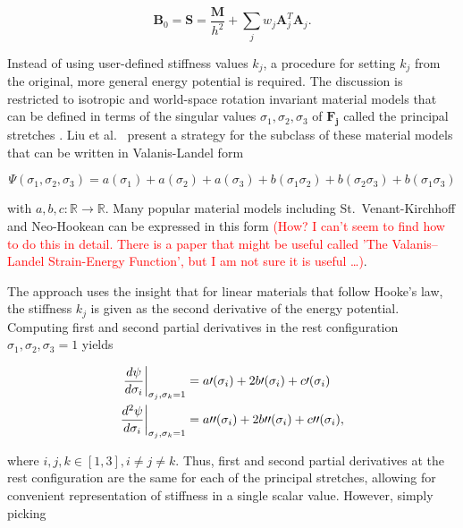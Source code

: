 \begin{equation}\label{eq:global-matrix-strain}
    \bm{B}_0 = \bm{S} = \frac{\bm{M}}{h^2} + \sum_j w_j \bm{A}_j^T \bm{A}_j.
\end{equation}

Instead of using user-defined stiffness values $k_j$, a procedure for setting $k_j$ from the original, more general energy
potential is required. The discussion is restricted to isotropic and world-space rotation invariant material models that 
can be defined in terms of the singular 
values $\sigma_1, \sigma_2, \sigma_3$ of $\bm{F_j}$ called the principal stretches \cite{sifakis2012}. Liu et al.\ 
\cite{liu2017} present a strategy for the subclass of these material models that can be written in Valanis-Landel form

\begin{equation}\label{eq:valanis-landel}
    \Psi(\sigma_1, \sigma_2, \sigma_3) = a(\sigma_1) + a(\sigma_2) + a(\sigma_3) + b(\sigma_1 \sigma_2) 
    + b(\sigma_2 \sigma_3) + b(\sigma_1 \sigma_3)
\end{equation}

\noindent with $a, b, c : \mathbb{R} \to \mathbb{R}$. Many popular material models including St.\ Venant-Kirchhoff and 
Neo-Hookean 
can be expressed in this form \textcolor{red}{(How? I can't seem to find how to do this in detail. There is a paper that 
might be useful called 'The Valanis–Landel Strain-Energy Function', but I am not sure it is useful \ldots)}.

The approach uses the insight that for linear materials that follow Hooke's law, the stiffness $k_j$ is given as the second 
derivative of the energy potential. Computing first and second partial derivatives in the rest configuration $\sigma_1, 
\sigma_2, \sigma_3 = 1$ yields

\begin{align}
    \evalat[\bigg]{\frac{d \psi}{d \sigma_i}}{\sigma_j, \sigma_k = 1} 
    &= a\prime(\sigma_i) + 2b\prime(\sigma_i) + c\prime(\sigma_i) \label{eq:valandis-landel-first} \\
    \evalat[\bigg]{\frac{d^2 \psi}{d \sigma_i}}{\sigma_j, \sigma_k = 1} 
    &= a\prime\prime(\sigma_i) + 2b\prime\prime(\sigma_i) + c\prime\prime(\sigma_i) \label{eq:valandis-landel-second},
\end{align}

\noindent where $i, j, k \in [1, 3], i \neq j \neq k$. Thus, first and second partial derivatives at the rest configuration are the same
for each of the principal stretches, allowing for convenient representation of stiffness in a single scalar value. However,
simply picking

